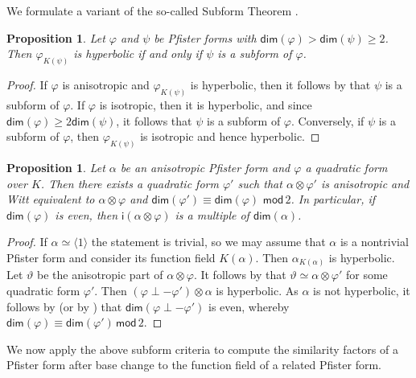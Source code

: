 \documentclass[twoside,11pt]{amsart}
\numberwithin{equation}{section}
\newtheorem{prop}[equation]{Proposition}
\theoremstyle{definition}
\renewcommand{\dim}{\mathsf{dim}}
\renewcommand{\bmod}{\,\mathsf{mod}\,}
\newcommand{\vf}{\varphi}
\newcommand{\la}{\langle}
\newcommand{\ra}{\rangle}
\renewcommand{\geq}{\geqslant}
\newcommand{\wi}{\mathsf{i}}
\begin{document}
We formulate a variant of the so-called Subform Theorem \cite[Theorem 22.5]{EKM08}.

\begin{prop}\label{Pfister-subform}
    Let $\vf$ and $\psi$ be Pfister forms with $\dim(\vf)>\dim(\psi)\geq 2$.
    Then $\vf_{K(\psi)}$ is hyperbolic if and only if $\psi$ is a subform of $\vf$.
\end{prop}
\begin{proof}
    If $\vf$ is anisotropic and $\vf_{K(\psi)}$ is hyperbolic, then it follows by \cite[Theorem 22.5]{EKM08} that $\psi$ is a subform of $\vf$.
    If $\vf$ is isotropic, then it is hyperbolic, and since $\dim(\vf)\geq 2\dim(\psi)$, it follows that $\psi$ is a subform of $\vf$.
    Conversely, if $\psi$ is a subform of $\vf$, then $\vf_{K(\psi)}$ is isotropic and hence hyperbolic.
\end{proof}


\begin{prop}\label{Pfister-multiple}
    Let $\alpha$ be an anisotropic Pfister form and $\varphi$ a quadratic form over $K$.
    Then there exists a quadratic form $\vf'$ such that 
    $\alpha\otimes \vf'$ is anisotropic and Witt equivalent to  $\alpha\otimes \vf$ and $\dim(\vf')\equiv \dim(\vf)\,\bmod 2$.
    In particular, if $\dim(\vf)$ is even, then $\wi(\alpha\otimes \vf)$ is a multiple of $\dim(\alpha)$.
\end{prop}
\begin{proof}
    If $\alpha\simeq \la 1\ra$ the statement is trivial, so we may assume that $\alpha$ is a nontrivial Pfister form and consider its function field $K(\alpha)$.
    Then $\alpha_{K(\alpha)}$ is hyperbolic.
    Let $\vartheta$ be the anisotropic part of $\alpha\otimes\vf$. It follows  by \cite[Chap.~X, Theorem 4.11]{Lam05} that $\vartheta\simeq \alpha\otimes\vf'$ for some quadratic form $\vf'$. 
    Then $(\varphi\perp-\varphi')\otimes \alpha$ is hyperbolic. 
    As $\alpha$ is not hyperbolic, it follows by \cite[Chap.~VIII, Cor.~8.5]{Lam05} (or by ) that $\dim(\varphi\perp-\varphi')$ is even, whereby $\dim (\vf)\equiv \dim (\vf')\bmod 2$.
\end{proof}

We now apply the above subform criteria to compute the similarity factors of a Pfister form after base change to the function field of a related Pfister form.
\end{document}
